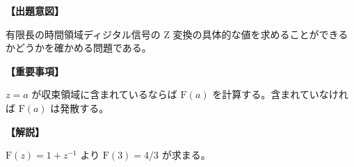 \noindent \textbf{【出題意図】}

\bigskip
\noindent 有限長の時間領域ディジタル信号の Z 変換の具体的な値を求めることができるかどうかを確かめる問題である。

\vspace{1em}
\noindent \textbf{【重要事項】}

\medskip
$z = a$ が収束領域に含まれているならば $\textrm{F}(a)$ を計算する。含まれていなければ $\textrm{F}(a)$ は発散する。

\bigskip

\vspace{1em}
\noindent \textbf{【解説】}

\bigskip
\noindent $\textrm{F}(z) = 1 + z^{-1}$  より $\textrm{F}(3) = 4/3$ が求まる。
